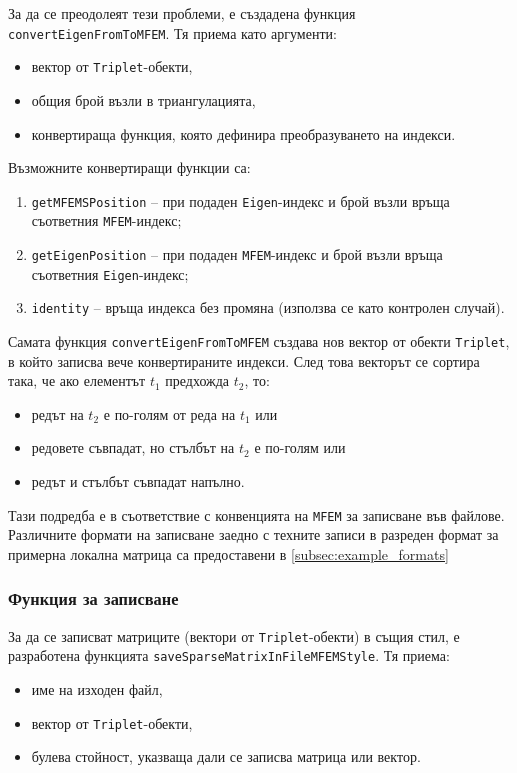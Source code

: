 \documentclass{report}
\begin{document}
	За да се преодолеят тези проблеми, е създадена функция \texttt{convertEigenFromToMFEM}. Тя приема като аргументи:
	\begin{itemize}
		\item вектор от \texttt{Triplet}-обекти,
		\item общия брой възли в триангулацията,
		\item конвертираща функция, която дефинира преобразуването на индекси.
	\end{itemize}
	
	Възможните конвертиращи функции са:
	\begin{enumerate}[label=\roman*)]
		\item \texttt{getMFEMSPosition} – при подаден \texttt{Eigen}-индекс и брой възли връща съответния \texttt{MFEM}-индекс;
		\item \texttt{getEigenPosition} – при подаден \texttt{MFEM}-индекс и брой възли връща съответния \texttt{Eigen}-индекс;
		\item \texttt{identity} – връща индекса без промяна (използва се като контролен случай).
	\end{enumerate}
	
	Самата функция \texttt{convertEigenFromToMFEM} създава нов вектор от обекти \texttt{Triplet}, в който записва вече конвертираните индекси. След това векторът се сортира така, че ако елементът $t_1$ предхожда $t_2$, то:
	\begin{itemize}
		\item редът на $t_2$ е по-голям от реда на $t_1$ или
		\item редовете съвпадат, но стълбът на $t_2$ е по-голям или
		\item редът и стълбът съвпадат напълно.
	\end{itemize}
	Тази подредба е в съответствие с конвенцията на \texttt{MFEM} за записване във файлове. Различните формати на записване заедно с техните записи в разреден формат за примерна локална матрица са предоставени в \ref{subsec:example_formats}
	
	\subsubsection*{Функция за записване}
	За да се записват матриците (вектори от \texttt{Triplet}-обекти) в същия стил, е разработена функцията \texttt{saveSparseMatrixInFileMFEMStyle}. Тя приема:
	\begin{itemize}
		\item име на изходен файл,
		\item вектор от \texttt{Triplet}-обекти,
		\item булева стойност, указваща дали се записва матрица или вектор.
	\end{itemize}
	
\end{document}
